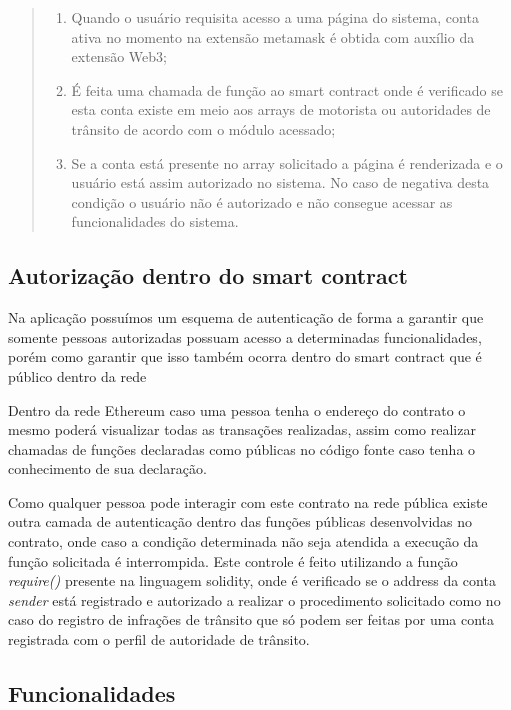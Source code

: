     \begin{quote}
        \begin{enumerate}
            \item Quando o usuário requisita acesso a uma página do sistema, conta ativa no momento na extensão metamask é obtida com auxílio da extensão Web3;
            \item É feita uma chamada de função ao smart contract onde é verificado se esta conta existe em meio aos arrays de motorista ou autoridades de trânsito de acordo com o módulo acessado;
            \item Se a conta está presente no array solicitado a página é renderizada e o usuário está assim autorizado no sistema. No caso de negativa desta condição o usuário não é autorizado e não consegue acessar as funcionalidades do sistema.
        \end{enumerate}
    \end{quote}

\subsection{Autorização dentro do smart contract}

Na aplicação possuímos um esquema de autenticação de forma a garantir que somente pessoas autorizadas possuam acesso a determinadas funcionalidades, porém como garantir que isso também ocorra dentro do smart contract que é público dentro da rede

Dentro da rede Ethereum caso uma pessoa tenha o endereço do contrato o mesmo poderá visualizar todas as transações realizadas, assim como realizar chamadas de funções declaradas como públicas no código fonte caso tenha o conhecimento de sua declaração.

Como qualquer pessoa pode interagir com este contrato na rede pública existe outra camada de autenticação dentro das funções públicas desenvolvidas no contrato, onde caso a condição determinada não seja atendida a execução da função solicitada é interrompida. Este controle é feito utilizando a função \textit{require()} presente na linguagem solidity, onde é verificado se o address da conta \textit{sender} está registrado e autorizado a realizar o procedimento solicitado como no caso do registro de infrações de trânsito que só podem ser feitas por uma conta registrada com o perfil de autoridade de trânsito.


\subsection{Funcionalidades}


